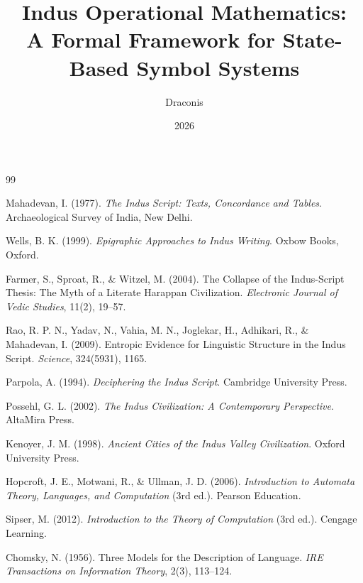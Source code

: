 \documentclass[12pt,a4paper]{book}
\theoremstyle{definition}
\theoremstyle{remark}
\begin{document}
\begin{thebibliography}{99}

Mahadevan, I. (1977).
\textit{The Indus Script: Texts, Concordance and Tables}.
Archaeological Survey of India, New Delhi.

Wells, B. K. (1999).
\textit{Epigraphic Approaches to Indus Writing}.
Oxbow Books, Oxford.

Farmer, S., Sproat, R., \& Witzel, M. (2004).
The Collapse of the Indus-Script Thesis: The Myth of a Literate Harappan Civilization.
\textit{Electronic Journal of Vedic Studies}, 11(2), 19--57.

Rao, R. P. N., Yadav, N., Vahia, M. N., Joglekar, H., Adhikari, R., \& Mahadevan, I. (2009).
Entropic Evidence for Linguistic Structure in the Indus Script.
\textit{Science}, 324(5931), 1165.

Parpola, A. (1994).
\textit{Deciphering the Indus Script}.
Cambridge University Press.

Possehl, G. L. (2002).
\textit{The Indus Civilization: A Contemporary Perspective}.
AltaMira Press.

Kenoyer, J. M. (1998).
\textit{Ancient Cities of the Indus Valley Civilization}.
Oxford University Press.

Hopcroft, J. E., Motwani, R., \& Ullman, J. D. (2006).
\textit{Introduction to Automata Theory, Languages, and Computation} (3rd ed.).
Pearson Education.

Sipser, M. (2012).
\textit{Introduction to the Theory of Computation} (3rd ed.).
Cengage Learning.

Chomsky, N. (1956).
Three Models for the Description of Language.
\textit{IRE Transactions on Information Theory}, 2(3), 113--124.

\end{thebibliography}


\title{Indus Operational Mathematics:\\
       A Formal Framework for State-Based Symbol Systems}
\author{Draconis}
\date{2026}
\end{document}
